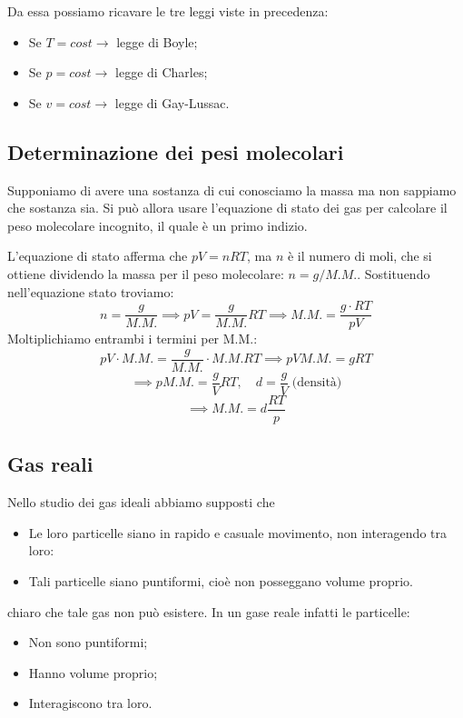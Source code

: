 Da essa possiamo ricavare le tre leggi viste in precedenza:

\begin{itemize}
    \item Se $T=cost \rightarrow$ legge di Boyle;
    \item Se $p=cost \rightarrow$ legge di Charles;
    \item Se $v=cost \rightarrow$ legge di Gay-Lussac.
\end{itemize}
\subsection{Determinazione dei pesi molecolari}
Supponiamo di avere una sostanza di cui conosciamo la massa ma non sappiamo che sostanza sia. Si può allora usare l'equazione di stato dei gas per calcolare il peso molecolare incognito, il quale è un primo indizio.

L'equazione di stato afferma che $pV=nRT$, ma $n$ è il numero di moli, che si ottiene dividendo la massa per il peso molecolare: $n=g/M.M.$. Sostituendo nell'equazione stato troviamo:
$$n=\frac{g}{M.M.} \implies pV=\frac{g}{M.M.}RT \implies M.M.=\frac{g \cdot RT}{pV}$$
Moltiplichiamo entrambi i termini per M.M.:
$$pV \cdot M.M.=\frac{g}{M.M.}\cdot M.M. RT \implies pV M.M. = gRT$$
$$ \implies pM.M. = \frac{g}{V}RT, \quad d=\frac{g}{V} \; \text{(densità)}$$
$$\implies M.M. = d \frac{RT}{p}$$
\subsection{Gas reali}
Nello studio dei gas ideali abbiamo supposti che

\begin{itemize}
    \item Le loro particelle siano in rapido e casuale movimento, non interagendo tra loro:
    \item Tali particelle siano puntiformi, cioè non posseggano volume proprio.
\end{itemize}

\E chiaro che tale gas non può esistere. In un gase reale infatti le particelle:

\begin{itemize}
    \item Non sono puntiformi;
    \item Hanno volume proprio;
    \item Interagiscono tra loro. 
\end{itemize}

